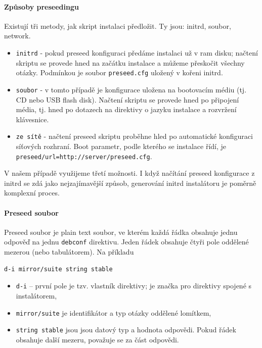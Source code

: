 \documentclass[thesis=B,czech]{FITthesis}[2012/06/26]
\begin{document}
\paragraph{Způsoby preseedingu}

Existují tři metody, jak skript instalaci předložit. Ty jsou: initrd, soubor, network.

\begin{itemize}
\item \texttt{initrd} - pokud preseed konfiguraci předáme instalaci už v ram disku; načtení skriptu se provede hned na začátku instalace a můžeme přeskočit všechny otázky. Podmínkou je soubor \texttt{preseed.cfg} uložený v kořeni initrd.
\item \texttt{soubor} - v tomto případě je konfigurace uložena na bootovacím médiu (tj. CD nebo USB flash disk). Načtení skriptu se provede hned po připojení média, tj. hned po dotazech na direktivy o jazyku instalace a rozvržení klávesnice.
\item \texttt{ze sítě} -  načtení preseed skriptu proběhne hled po automatické konfiguraci síťových rozhraní. Boot parametr, podle kterého se instalace řídí, je \texttt{preseed/url=http://server/preseed.cfg}.
\end{itemize}


V našem případě využijeme třetí možnosti. I když načítání preseed konfigurace z initrd se zdá jako nejzajímavější způsob, generování initrd instalátoru je poměrně komplexní proces.


\paragraph{Preseed soubor}

Preseed soubor je plain text soubor, ve kterém každá řádka obsahuje jednu odpověď na jednu \texttt{debconf} direktivu. Jeden řádek obsahuje čtyři pole oddělené mezerou (nebo tabulátorem). Na příkladu
\begin{verbatim}
d-i mirror/suite string stable
\end{verbatim}

\begin{itemize}

\item \texttt{d-i} -- první pole je tzv. vlastník direktivy; \texttt{} je značka pro direktivy spojené s instalátorem,
\item \texttt{mirror/suite} je identifikátor a typ otázky oddělené lomítkem,
\item \texttt{string stable} jsou jsou datový typ a hodnota odpovědi. Pokud řádek obsahuje další mezeru, považuje se za část odpovědi.
\end{itemize}
\end{document}

